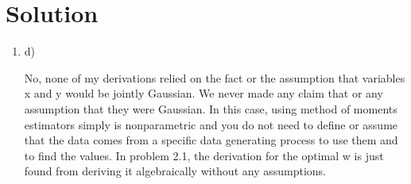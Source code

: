 \documentclass[submit]{../harvardml}
\newenvironment{solution}
  {\color{blue}\section*{Solution}}
{}
\begin{document}
\begin{solution}
\begin{tcolorbox}[title=Solution,colback=white,colframe=black, breakable]
\begin{enumerate}
  \item d)
  
  No, none of my derivations relied on the fact or the assumption that variables x and y would be jointly Gaussian. We never made any claim that or any assumption that they were Gaussian. In this case, using method of moments estimators simply is nonparametric and you do not need to define or assume that the data comes from a specific data generating process to use them and to find the values. In problem 2.1, the derivation for the optimal w is just found from deriving it algebraically without any assumptions.




\end{enumerate}





\end{tcolorbox}





\end{solution}
\end{document}
